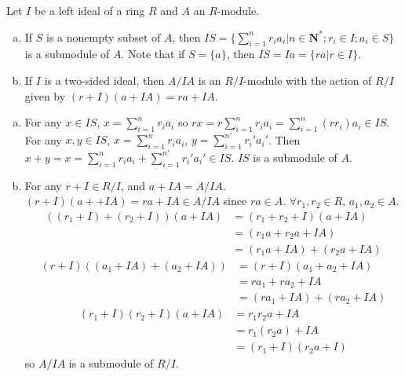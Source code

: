 $$ $$

\begin{ex}
    Let $I$ be a left ideal of a ring $R$ and $A$ an $R$-module.
    \begin{enumerate}[(a)]
        \item If $S$ is a nonempty subset of $A$, then $IS=\{\sum\limits_{i=1}^{n}r_{i}a_{i}|n\in \mathbf{N}^{*}; r_{i}\in I;a_{i}\in S\}$ is a submodule of $A$. Note that if $S=\{a\}$, then $IS=Ia=\{ra|r\in I\}$.
        \item If $I$ is a two-sided ideal, then $A /IA$ is an $R /I$-module with the action of $R /I$ given by $(r+I)(a+IA)=ra+IA$.
    \end{enumerate}
\end{ex}

\begin{answer}
    \begin{enumerate}[(a)]
        \item For any $x\in IS$, $x=\sum\limits_{i=1}^{n}r_{i}a_{i}$ so $rx=r\sum\limits_{i=1}^{n}r_{i}a_{i}=\sum\limits_{i=1}^{n}(rr_{i})a_{i}\in IS$. For any $x,y\in IS$, $x=\sum\limits_{i=1}^{n}r_{i}a_{i}$, $y=\sum\limits_{i=1}^{n'}r_{i}'a_{i}'$. Then $x+y=x=\sum\limits_{i=1}^{n}r_{i}a_{i}+\sum\limits_{i=1}^{n'}r_{i}'a_{i}'\in IS$. $IS$ is a submodule of $A$.
        \item For any $r+I\in R /I$, and $a+IA=A /IA$. $(r+I)(a++IA)=ra+IA\in A /IA$ since $ra\in A$. $\forall r_{1},r_{2}\in R$, $a_{1},a_{2}\in A$. \[\begin{aligned}
            ((r_{1}+I)+(r_{2}+I))(a+IA)&=(r_{1}+r_{2}+I)(a+IA)\\&=(r_{1}a+r_{2}a+IA)\\&=(r_{1}a+IA)+(r_{2}a+IA)
        \end{aligned}\]
        \[\begin{aligned}
            (r+I)((a_{1}+IA)+(a_{2}+IA))&=(r+I)(a_{1}+a_{2}+IA)\\&=ra_{1}+ra_{2}+IA\\&=(ra_{1}+IA)+(ra_{2}+IA)
        \end{aligned}\]
        \[\begin{aligned}
            (r_{1}+I)(r_{2}+I)(a+IA)&=r_{1}r_{2}a+IA\\&=r_{1}(r_{2}a)+IA\\&=(r_{1}+I)(r_{2}a+I)
        \end{aligned}\]
        so $A /IA$ is a submodule of $R /I$.
    \end{enumerate}
\end{answer}

